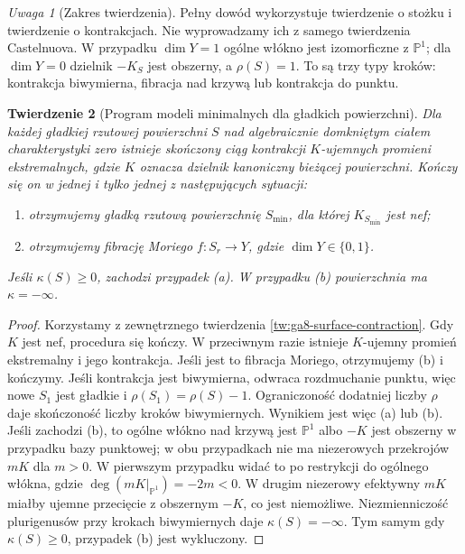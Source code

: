 \documentclass[11pt,a4paper,openany]{report}
\numberwithin{equation}{section}
\theoremstyle{plain}
\newtheorem{twierdzenie}{Twierdzenie}[section]
\theoremstyle{definition}
\theoremstyle{remark}
\newtheorem{uwaga}[twierdzenie]{Uwaga}
\newcommand{\PP}{\mathbb P}
\begin{document}
\begin{uwaga}[Zakres twierdzenia]
Pełny dowód wykorzystuje twierdzenie o stożku i twierdzenie
o kontrakcjach. Nie wyprowadzamy ich z samego twierdzenia
Castelnuova. W przypadku $\dim Y=1$ ogólne włókno
jest izomorficzne z $\PP^1$; dla $\dim Y=0$ dzielnik
$-K_S$ jest obszerny, a $\rho(S)=1$.
To są trzy typy kroków: kontrakcja biwymierna,
fibracja nad krzywą lub kontrakcja do punktu.
\end{uwaga}

\begin{twierdzenie}[Program modeli minimalnych dla gładkich powierzchni]
\label{tw:ga8-surface-mmp}
Dla każdej gładkiej rzutowej powierzchni $S$
nad algebraicznie domkniętym ciałem charakterystyki zero
istnieje skończony ciąg kontrakcji $K$-ujemnych
promieni ekstremalnych, gdzie $K$ oznacza dzielnik
kanoniczny bieżącej powierzchni. Kończy się on w jednej
i tylko jednej z następujących sytuacji:
\begin{enumerate}[label=(\alph*)]
\item otrzymujemy gładką rzutową powierzchnię $S_{\min}$,
dla której $K_{S_{\min}}$ jest nef;
\item otrzymujemy fibrację Moriego $f:S_r\to Y$,
gdzie $\dim Y\in\{0,1\}$.
\end{enumerate}
Jeśli $\kappa(S)\ge0$, zachodzi przypadek (a).
W przypadku (b) powierzchnia ma $\kappa=-\infty$.
\end{twierdzenie}
\begin{proof}
Korzystamy z zewnętrznego twierdzenia
\ref{tw:ga8-surface-contraction}. Gdy $K$ jest nef,
procedura się kończy. W przeciwnym razie istnieje
$K$-ujemny promień ekstremalny i jego kontrakcja.
Jeśli jest to fibracja Moriego, otrzymujemy (b)
i kończymy. Jeśli kontrakcja jest biwymierna,
odwraca rozdmuchanie punktu, więc nowe $S_1$
jest gładkie i $\rho(S_1)=\rho(S)-1$.
Ograniczoność dodatniej liczby $\rho$ daje skończoność
liczby kroków biwymiernych. Wynikiem jest więc
(a) lub (b). Jeśli zachodzi (b), to ogólne włókno
nad krzywą jest $\PP^1$ albo $-K$ jest obszerny
w przypadku bazy punktowej; w obu przypadkach
nie ma niezerowych przekrojów $mK$ dla $m>0$.
W pierwszym przypadku widać to po restrykcji
do ogólnego włókna, gdzie
$\deg(mK|_{\PP^1})=-2m<0$.
W drugim niezerowy efektywny $mK$ miałby
ujemne przecięcie z obszernym $-K$, co jest
niemożliwe. Niezmienniczość plurigenusów przy
krokach biwymiernych daje $\kappa(S)=-\infty$.
Tym samym gdy $\kappa(S)\ge0$, przypadek (b)
jest wykluczony.
\end{proof}
\end{document}
